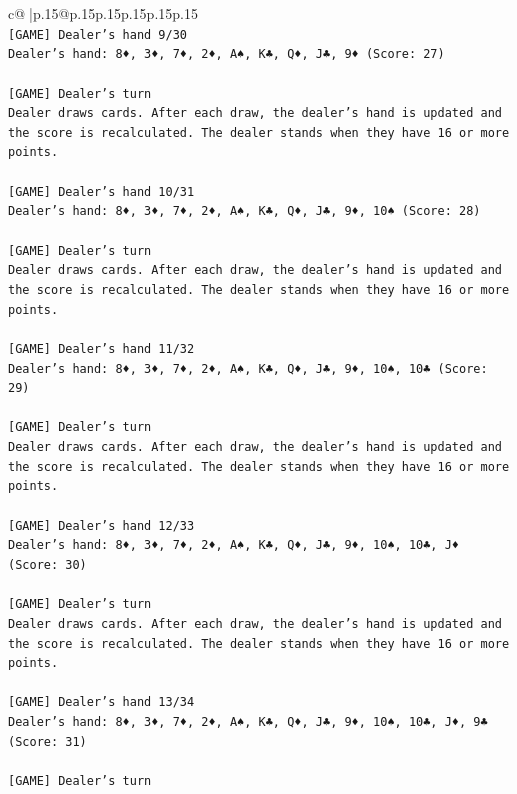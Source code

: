 \documentclass{article}
\begin{document}
{\begin{supertabular}{c@{$\;$}|p{.15\linewidth}@{}p{.15\linewidth}p{.15\linewidth}p{.15\linewidth}p{.15\linewidth}p{.15\linewidth}}
{{{\\ 
\texttt{{[}GAME{]} Dealer's hand 9/30} \\
\texttt{Dealer's hand: 8♦, 3♦, 7♦, 2♦, A♠, K♣, Q♦, J♣, 9♦ (Score: 27)} \\
\\ 
\texttt{{[}GAME{]} Dealer's turn} \\
\texttt{Dealer draws cards. After each draw, the dealer's hand is updated and the score is recalculated. The dealer stands when they have 16 or more points.} \\
\\ 
\texttt{{[}GAME{]} Dealer's hand 10/31} \\
\texttt{Dealer's hand: 8♦, 3♦, 7♦, 2♦, A♠, K♣, Q♦, J♣, 9♦, 10♠ (Score: 28)} \\
\\ 
\texttt{{[}GAME{]} Dealer's turn} \\
\texttt{Dealer draws cards. After each draw, the dealer's hand is updated and the score is recalculated. The dealer stands when they have 16 or more points.} \\
\\ 
\texttt{{[}GAME{]} Dealer's hand 11/32} \\
\texttt{Dealer's hand: 8♦, 3♦, 7♦, 2♦, A♠, K♣, Q♦, J♣, 9♦, 10♠, 10♣ (Score: 29)} \\
\\ 
\texttt{{[}GAME{]} Dealer's turn} \\
\texttt{Dealer draws cards. After each draw, the dealer's hand is updated and the score is recalculated. The dealer stands when they have 16 or more points.} \\
\\ 
\texttt{{[}GAME{]} Dealer's hand 12/33} \\
\texttt{Dealer's hand: 8♦, 3♦, 7♦, 2♦, A♠, K♣, Q♦, J♣, 9♦, 10♠, 10♣, J♦ (Score: 30)} \\
\\ 
\texttt{{[}GAME{]} Dealer's turn} \\
\texttt{Dealer draws cards. After each draw, the dealer's hand is updated and the score is recalculated. The dealer stands when they have 16 or more points.} \\
\\ 
\texttt{{[}GAME{]} Dealer's hand 13/34} \\
\texttt{Dealer's hand: 8♦, 3♦, 7♦, 2♦, A♠, K♣, Q♦, J♣, 9♦, 10♠, 10♣, J♦, 9♣ (Score: 31)} \\
\\ 
\texttt{{[}GAME{]} Dealer's turn} \\
}}}
\end{supertabular}}
\end{document}
